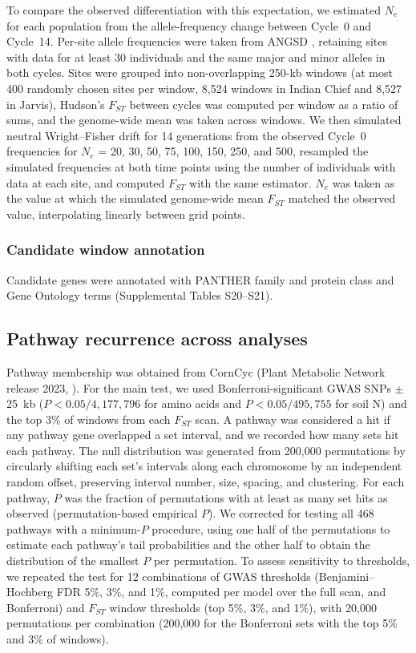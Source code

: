 \documentclass[namedate,unnumsec,webpdf,contemporary,large]{oup-authoring-template}
\begin{document}
To compare the observed differentiation with this expectation, we estimated $N_e$ for each population from the allele-frequency change between Cycle~0 and Cycle~14. Per-site allele frequencies were taken from ANGSD \citep{Korneliussen2014ANGSD}, retaining sites with data for at least 30 individuals and the same major and minor alleles in both cycles. Sites were grouped into non-overlapping 250-kb windows (at most 400 randomly chosen sites per window, 8,524 windows in Indian Chief and 8,527 in Jarvis), Hudson's $F_{ST}$ \citep{Bhatia2013Fst} between cycles was computed per window as a ratio of sums, and the genome-wide mean was taken across windows. We then simulated neutral Wright--Fisher drift for 14 generations from the observed Cycle~0 frequencies for $N_e$ = 20, 30, 50, 75, 100, 150, 250, and 500, resampled the simulated frequencies at both time points using the number of individuals with data at each site, and computed $F_{ST}$ with the same estimator. $N_e$ was taken as the value at which the simulated genome-wide mean $F_{ST}$ matched the observed value, interpolating linearly between grid points.

\subsubsection{Candidate window annotation}

Candidate genes were annotated with PANTHER family and protein class \citep{Thomas2022PANTHER} and Gene Ontology terms \citep{GO2026} (Supplemental Tables S20--S21).

\subsection{Pathway recurrence across analyses}
Pathway membership was obtained from CornCyc (Plant Metabolic Network release 2023, \citealp{Hawkins2021PMN}). For the main test, we used Bonferroni-significant GWAS SNPs $\pm$25~kb ($P < 0.05/4{,}177{,}796$ for amino acids and $P < 0.05/495{,}755$ for soil N) and the top 3\% of windows from each $F_{ST}$ scan. A pathway was considered a hit if any pathway gene overlapped a set interval, and we recorded how many sets hit each pathway. The null distribution was generated from 200,000 permutations by circularly shifting each set's intervals along each chromosome by an independent random offset, preserving interval number, size, spacing, and clustering. For each pathway, $P$ was the fraction of permutations with at least as many set hits as observed (permutation-based empirical $P$). We corrected for testing all 468 pathways with a minimum-$P$ procedure, using one half of the permutations to estimate each pathway's tail probabilities and the other half to obtain the distribution of the smallest $P$ per permutation. To assess sensitivity to thresholds, we repeated the test for 12 combinations of GWAS thresholds (Benjamini--Hochberg FDR 5\%, 3\%, and 1\%, computed per model over the full scan, and Bonferroni) and $F_{ST}$ window thresholds (top 5\%, 3\%, and 1\%), with 20,000 permutations per combination (200,000 for the Bonferroni sets with the top 5\% and 3\% of windows).
\end{document}
